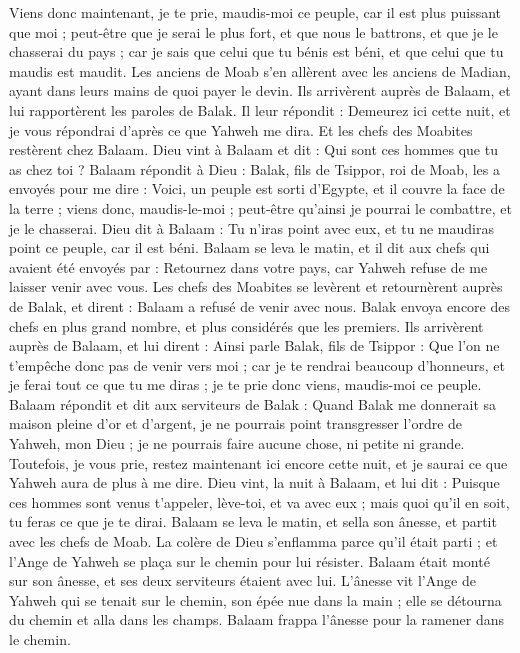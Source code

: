 \begin{multicols}{2}
Viens donc maintenant, je te prie, maudis-moi ce peuple, car il est plus puissant que moi ; peut-être que je serai le plus fort, et que nous le battrons, et que je le chasserai du pays ; car je sais que celui que tu bénis est béni, et que celui que tu maudis est maudit.
Les anciens de Moab s'en allèrent avec les anciens de Madian, ayant dans leurs mains de quoi payer le devin. Ils arrivèrent auprès de Balaam, et lui rapportèrent les paroles de Balak.
Il leur répondit : Demeurez ici cette nuit, et je vous répondrai d’après ce que Yahweh me dira. Et les chefs des Moabites restèrent chez Balaam.
Dieu vint à Balaam et dit : Qui sont ces hommes que tu as chez toi ?
Balaam répondit à Dieu : Balak, fils de Tsippor, roi de Moab, les a envoyés pour me dire :
Voici, un peuple est sorti d'Egypte, et il couvre la face de la terre ; viens donc, maudis-le-moi ; peut-être qu’ainsi je pourrai le combattre, et je le chasserai.
Dieu dit à Balaam : Tu n'iras point avec eux, et tu ne maudiras point ce peuple, car il est béni.
Balaam se leva le matin, et il dit aux chefs qui avaient été envoyés par : Retournez dans votre pays, car Yahweh refuse de me laisser venir avec vous.
Les chefs des Moabites se levèrent et retournèrent auprès de Balak, et dirent : Balaam a refusé de venir avec nous.
Balak envoya encore des chefs en plus grand nombre, et plus considérés que les premiers.
Ils arrivèrent auprès de Balaam, et lui dirent : Ainsi parle Balak, fils de Tsippor : Que l’on ne t’empêche donc pas de venir vers moi ;
car je te rendrai beaucoup d’honneurs, et je ferai tout ce que tu me diras ; je te prie donc viens, maudis-moi ce peuple.
Balaam répondit et dit aux serviteurs de Balak : Quand Balak me donnerait sa maison pleine d'or et d'argent, je ne pourrais point transgresser l’ordre de Yahweh, mon Dieu ; je ne pourrais faire aucune chose, ni petite ni grande.
Toutefois, je vous prie, restez maintenant ici encore cette nuit, et je saurai ce que Yahweh aura de plus à me dire.
Dieu vint, la nuit à Balaam, et lui dit : Puisque ces hommes sont venus t'appeler, lève-toi, et va avec eux ; mais quoi qu'il en soit, tu feras ce que je te dirai.
Balaam se leva le matin, et sella son ânesse, et partit avec les chefs de Moab.
La colère de Dieu s'enflamma parce qu'il était parti ; et l'Ange de Yahweh se plaça sur le chemin pour lui résister. Balaam était monté sur son ânesse, et ses deux serviteurs étaient avec lui.
L'ânesse vit l'Ange de Yahweh qui se tenait sur le chemin, son épée nue dans la main ; elle se détourna du chemin et alla dans les champs. Balaam frappa l'ânesse pour la ramener dans le chemin.

\end{multicols}
